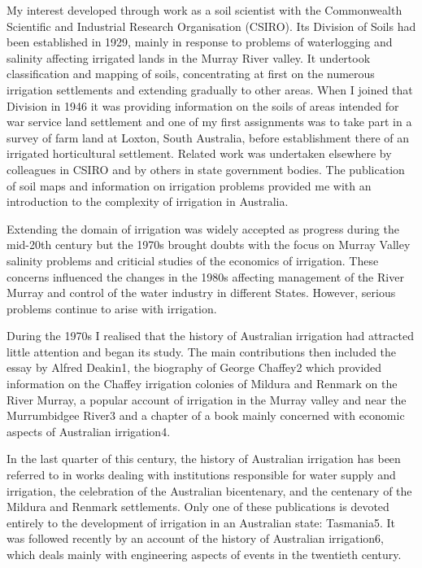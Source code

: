 My interest developed through work as a soil scientist with the
Commonwealth Scientific and Industrial Research Organisation
(CSIRO). Its Division of Soils had been established in 1929, mainly in
response to problems of waterlogging and salinity affecting irrigated
lands in the Murray River valley. It undertook classification and
mapping of soils, concentrating at first on the numerous irrigation
settlements and extending gradually to other areas. When I joined that
Division in 1946 it was providing information on the soils of areas
intended for war service land settlement and one of my first
assignments was to take part in a survey of farm land at Loxton, South
Australia, before establishment there of an irrigated horticultural
settlement. Related work was undertaken elsewhere by colleagues in
CSIRO and by others in state government bodies. The publication of
soil maps and information on irrigation problems provided me with an
introduction to the complexity of irrigation in Australia.

Extending the domain of irrigation was widely accepted as progress
during the mid-20th century but the 1970s brought doubts with the
focus on Murray Valley salinity problems and criticial studies of the
economics of irrigation. These concerns influenced the changes in the
1980s affecting management of the River Murray and control of the
water industry in different States. However, serious problems continue
to arise with irrigation.

During the 1970s I realised that the history of Australian irrigation
had attracted little attention and began its study. The main
contributions then included the essay by Alfred Deakin1, the biography
of George Chaffey2 which provided information on the Chaffey
irrigation colonies of Mildura and Renmark on the River Murray, a
popular account of irrigation in the Murray valley and near the
Murrumbidgee River3 and a chapter of a book mainly concerned with
economic aspects of Australian irrigation4.

In the last quarter of this century, the history of Australian
irrigation has been referred to in works dealing with institutions
responsible for water supply and irrigation, the celebration of the
Australian bicentenary, and the centenary of the Mildura and Renmark
settlements. Only one of these publications is devoted entirely to the
development of irrigation in an Australian state: Tasmania5. It was
followed recently by an account of the history of Australian
irrigation6, which deals mainly with engineering aspects of events in
the twentieth century.

